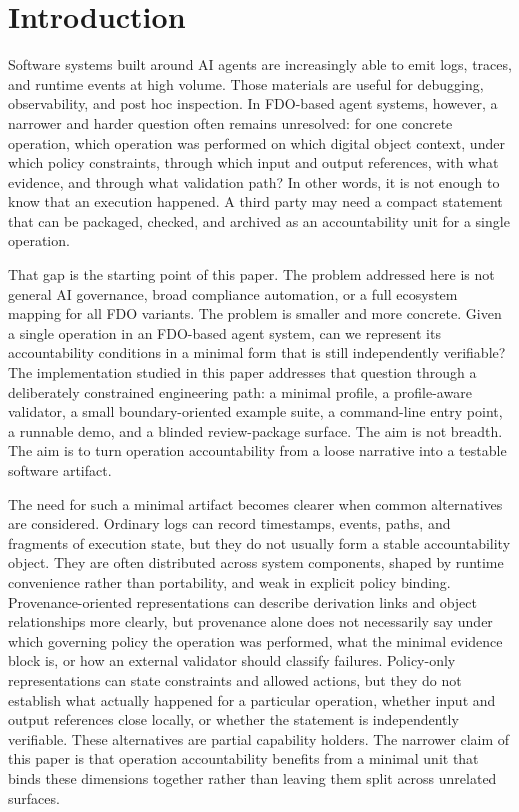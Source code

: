 \section{Introduction}

Software systems built around AI agents are increasingly able to emit logs, traces, and runtime events at high volume. Those materials are useful for debugging, observability, and post hoc inspection. In FDO-based agent systems, however, a narrower and harder question often remains unresolved: for one concrete operation, which operation was performed on which digital object context, under which policy constraints, through which input and output references, with what evidence, and through what validation path? In other words, it is not enough to know that an execution happened. A third party may need a compact statement that can be packaged, checked, and archived as an accountability unit for a single operation.

That gap is the starting point of this paper. The problem addressed here is not general AI governance, broad compliance automation, or a full ecosystem mapping for all FDO variants. The problem is smaller and more concrete. Given a single operation in an FDO-based agent system, can we represent its accountability conditions in a minimal form that is still independently verifiable? The implementation studied in this paper addresses that question through a deliberately constrained engineering path: a minimal profile, a profile-aware validator, a small boundary-oriented example suite, a command-line entry point, a runnable demo, and a blinded review-package surface. The aim is not breadth. The aim is to turn operation accountability from a loose narrative into a testable software artifact.

The need for such a minimal artifact becomes clearer when common alternatives are considered. Ordinary logs can record timestamps, events, paths, and fragments of execution state, but they do not usually form a stable accountability object. They are often distributed across system components, shaped by runtime convenience rather than portability, and weak in explicit policy binding. Provenance-oriented representations can describe derivation links and object relationships more clearly, but provenance alone does not necessarily say under which governing policy the operation was performed, what the minimal evidence block is, or how an external validator should classify failures. Policy-only representations can state constraints and allowed actions, but they do not establish what actually happened for a particular operation, whether input and output references close locally, or whether the statement is independently verifiable. These alternatives are partial capability holders. The narrower claim of this paper is that operation accountability benefits from a minimal unit that binds these dimensions together rather than leaving them split across unrelated surfaces.

